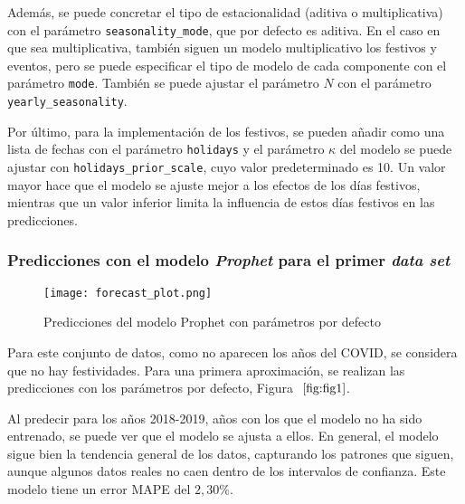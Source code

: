 \documentclass[12pt,twoside]{article}
\begin{document}
Además, se puede concretar el tipo de estacionalidad (aditiva o multiplicativa) con el parámetro \texttt{seasonality\_mode}, que por defecto es aditiva. En el caso en que sea multiplicativa, también siguen un modelo multiplicativo los festivos y eventos, pero se puede especificar el tipo de modelo de cada componente con el parámetro \texttt{mode}. También se puede ajustar el parámetro $N$ con el parámetro \texttt{yearly\_seasonality}.

Por último, para la implementación de los festivos, se pueden añadir como una lista de fechas con el parámetro \texttt{holidays} y el parámetro $\kappa$ del modelo se puede ajustar con \texttt{holidays\_prior\_scale}, cuyo valor predeterminado es 10. Un valor mayor hace que el modelo se ajuste mejor a los efectos de los días festivos, mientras que un valor inferior limita la influencia de estos días festivos en las predicciones.

\subsubsection{Predicciones con el modelo \textit{Prophet} para el primer \textit{data set}}\label{sec:8}

\begin{figure}[h]
    \centering
    \texttt{[image: forecast\_plot.png]}
    \caption{Predicciones del modelo Prophet con parámetros por defecto} 
    \label{fig:fig1}
\end{figure}

Para este conjunto de datos, como no aparecen los años del COVID, se considera que no hay festividades. Para una primera aproximación, se realizan las predicciones con los parámetros por defecto, Figura $~\ref{fig:fig1}$.



Al predecir para los años 2018-2019, años con los que el modelo no ha sido entrenado, se puede ver que el modelo se ajusta a ellos. En general, el modelo sigue bien la tendencia general de los datos, capturando los patrones que siguen, aunque algunos datos reales no caen dentro de los intervalos de confianza. Este modelo tiene un error MAPE del $2,30\%$.
\end{document}
